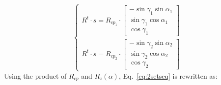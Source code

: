 \begin{equation}
\begin{cases}
R^{t}\cdot s=R_{cp_{1}}\cdot\left[\begin{array}{c}
-\sin\gamma_{1}\sin\alpha_{1}\\
\sin\gamma_{1}\cos\alpha_{1}\\
\cos\gamma_{1}
\end{array}\right]\\
R^{t}\cdot s=R_{cp_{2}}\cdot\left[\begin{array}{c}
-\sin\gamma_{2}\sin\alpha_{2}\\
\sin\gamma_{2}\cos\alpha_{2}\\
\cos\gamma_{2}
\end{array}\right]
\end{cases}\label{eq:2setseq}
\end{equation}
\noindent Using the product of $R_{cp}$ and $R_z(\alpha)$, Eq.~\ref{eq:2setseq}
is rewritten as:

